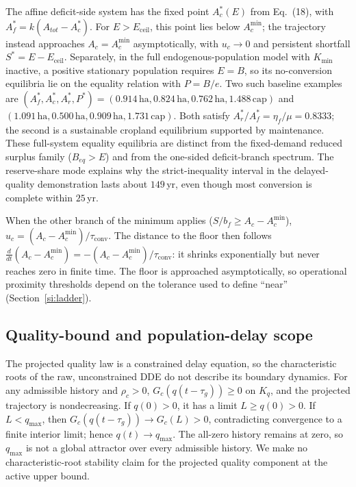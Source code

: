 \documentclass[11pt,a4paper]{article}
\newcommand{\Eceil}{E_{\mathrm{ceil}}}
\newcommand{\Acmin}{A_c^{\min}}
\newcommand{\tconv}{\tau_{\mathrm{conv}}}
\begin{document}
The affine deficit-side system has the fixed point $A_c^*(E)$ from Eq.~(18), with $A_f^*=k(A_{tot}-A_c^*)$. For $E>\Eceil$, this point lies below $\Acmin$; the trajectory instead approaches $A_c=\Acmin$ asymptotically, with $u_c\to0$ and persistent shortfall $S^*=E-\Eceil$. Separately, in the full endogenous-population model with $K_{\min}$ inactive, a positive stationary population requires $E=B$, so its no-conversion equilibria lie on the equality relation with $P=B/e$. Two such baseline examples are $(A_f^*,A_c^*,A_r^*,P^*)=(0.914\,\mathrm{ha},0.824\,\mathrm{ha},0.762\,\mathrm{ha},1.488\,\mathrm{cap})$ and $(1.091\,\mathrm{ha},0.500\,\mathrm{ha},0.909\,\mathrm{ha},1.731\,\mathrm{cap})$. Both satisfy $A_r^*/A_f^*=\eta_f/\mu=0.8333$; the second is a sustainable cropland equilibrium supported by maintenance. These full-system equality equilibria are distinct from the fixed-demand reduced surplus family ($B_{eq}>E$) and from the one-sided deficit-branch spectrum. The reserve-share mode explains why the strict-inequality interval in the delayed-quality demonstration lasts about $149$\,yr, even though most conversion is complete within $25$\,yr.

When the other branch of the minimum applies ($S/b_f\ge A_c-\Acmin$), $u_c=(A_c-\Acmin)/\tconv$. The distance to the floor then follows $\frac{d}{dt}(A_c-\Acmin)=-(A_c-\Acmin)/\tconv$: it shrinks exponentially but never reaches zero in finite time. The floor is approached asymptotically, so operational proximity thresholds depend on the tolerance used to define “near” (Section~\ref{si:ladder}).

\subsection{Quality-bound and population-delay scope}\label{si:char}

The projected quality law is a constrained delay equation, so the characteristic roots of the raw, unconstrained DDE do not describe its boundary dynamics. For any admissible history and $\rho_c>0$, $G_c(q(t-\tau_g))\ge0$ on $K_q$, and the projected trajectory is nondecreasing. If $q(0)>0$, it has a limit $L\ge q(0)>0$. If $L<q_{\max}$, then $G_c(q(t-\tau_g))\to G_c(L)>0$, contradicting convergence to a finite interior limit; hence $q(t)\to q_{\max}$. The all-zero history remains at zero, so $q_{\max}$ is not a global attractor over every admissible history. We make no characteristic-root stability claim for the projected quality component at the active upper bound.
\end{document}
